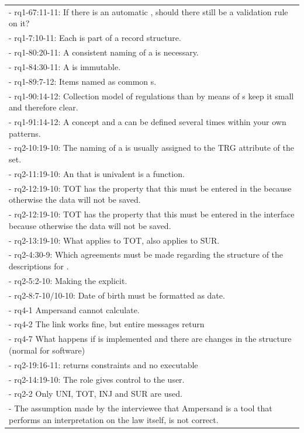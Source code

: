 \begin{xltabular}{\textwidth}{|X|}
-	rq1-67:11-11: If there is an automatic , should there still be a validation rule on it?	\\
-	rq1-7:10-11: Each  is part of a record structure.	\\
-	rq1-80:20-11: A consistent naming of a  is necessary.	\\
-	rq1-84:30-11: A  is immutable.	\\
-	rq1-89:7-12: Items named as common s.	\\
-	rq1-90:14-12: Collection model of regulations than by means of s keep it small and therefore clear.	\\
-	rq1-91:14-12: A {concept} and a  can be defined several times within your own patterns.	\\
-	rq2-10:19-10: The naming of a  is usually assigned to the TRG attribute of the set.	\\
-	rq2-11:19-10: An  that is univalent is a function.	\\
-	rq2-12:19-10: TOT has the property that this must be entered in the  because otherwise the data will not be saved.	\\
-	rq2-12:19-10: TOT has the property that this must be entered in the {interface} because otherwise the data will not be saved.	\\
-	rq2-13:19-10: What applies to  TOT, also applies to SUR. 	\\
-	rq2-4:30-9: Which agreements must be made regarding the structure of the descriptions for .	\\
-	rq2-5:2-10: Making the  explicit.	\\
-	rq2-8:7-10/10-10: Date of birth must be formatted as date.	\\
-	rq4-1 Ampersand cannot calculate.	\\
-	rq4-2 The  link works fine, but entire messages return	\\
-	rq4-7 What happens if  is implemented and there are changes in the structure (normal for software)	\\
-	 rq2-19:16-11:  returns constraints and no executable	\\
-	 rq2-14:19-10: The role gives control to the user.	\\
-	 rq2-2 Only UNI, TOT, INJ and SUR are used.	\\
-	The assumption made by the interviewee that Ampersand is a tool that performs an interpretation on the law itself, is not correct. 	\\

\end{xltabular}
